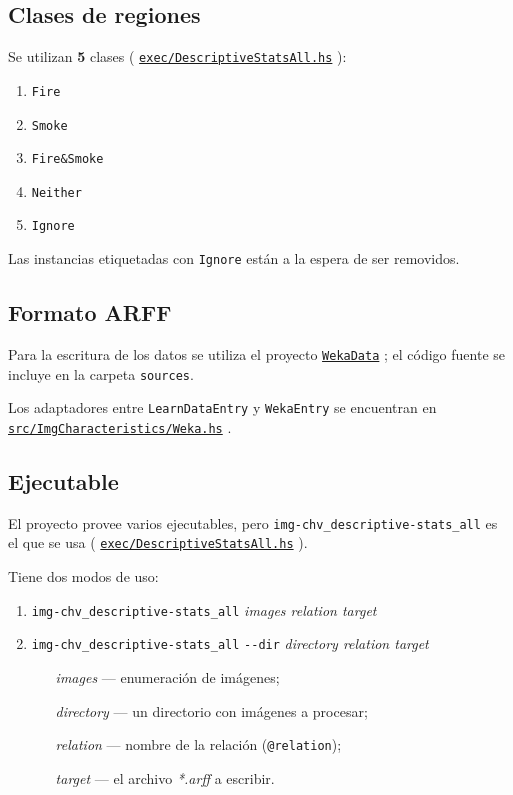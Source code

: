 \documentclass{article}
\newcommand\refcode[2]{ \href{#1}{\texttt{#2}} }
\begin{document}
\subsection{Clases de regiones}
Se utilizan \textbf{5} clases (\refcode{\ExecAll}{exec/DescriptiveStatsAll.hs}):
\begin{enumerate}
    \item \verb|Fire|
    \item \verb|Smoke|
    \item \verb|Fire&Smoke|
    \item \verb|Neither|
    \item \verb|Ignore|
\end{enumerate}

Las instancias etiquetadas con \verb|Ignore| están a la espera de ser removidos.

\subsection{Formato ARFF}

Para la escritura de los datos se utiliza el proyecto \refcode{\WekaData}{WekaData}; el código fuente se incluye en la carpeta \verb|sources|.

Los adaptadores entre \verb|LearnDataEntry| y \verb|WekaEntry| se encuentran en\\ \refcode{\Weka}{src/ImgCharacteristics/Weka.hs}.

\subsection{Ejecutable}
El proyecto provee varios ejecutables, pero \verb|img-chv_descriptive-stats_all| es el que se usa (\refcode{\ExecAll}{exec/DescriptiveStatsAll.hs}).

Tiene dos modos de uso:
\begin{enumerate}
\item \texttt{img-chv\_descriptive-stats\_all} \textit{images relation target}
\item \texttt{img-chv\_descriptive-stats\_all} \verb|--dir| 
       \textit{directory relation target}
    \begin{itemize}[leftmargin=2cm]
        \item[\textit{images}]   --- enumeración de imágenes;
        \item[\textit{directory}]--- un directorio con imágenes a procesar;
        \item[\textit{relation}] --- nombre de la relación (\verb|@relation|);
        \item[\textit{target}]   --- el archivo \emph{*.arff} a escribir.
    \end{itemize}
\end{enumerate}
\end{document}
